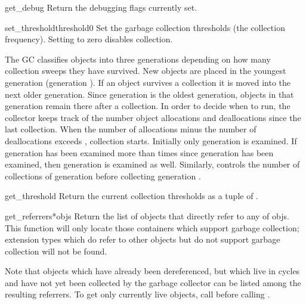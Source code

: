 \begin{funcdesc}{get_debug}{}
Return the debugging flags currently set.
\end{funcdesc}

\begin{funcdesc}{set_threshold}{threshold0}
Set the garbage collection thresholds (the collection frequency).
Setting  to zero disables collection.

The GC classifies objects into three generations depending on how many
collection sweeps they have survived.  New objects are placed in the
youngest generation (generation ).  If an object survives a
collection it is moved into the next older generation.  Since
generation  is the oldest generation, objects in that
generation remain there after a collection.  In order to decide when
to run, the collector keeps track of the number object allocations and
deallocations since the last collection.  When the number of
allocations minus the number of deallocations exceeds
, collection starts.  Initially only generation
 is examined.  If generation  has been examined more
than  times since generation  has been
examined, then generation  is examined as well.  Similarly,
 controls the number of collections of generation
 before collecting generation .
\end{funcdesc}

\begin{funcdesc}{get_threshold}{}
Return the current collection thresholds as a tuple of
.
\end{funcdesc}

\begin{funcdesc}{get_referrers}{*objs}
Return the list of objects that directly refer to any of objs. This
function will only locate those containers which support garbage
collection; extension types which do refer to other objects but do not
support garbage collection will not be found.

Note that objects which have already been dereferenced, but which live
in cycles and have not yet been collected by the garbage collector can
be listed among the resulting referrers.  To get only currently live
objects, call  before calling
.

\end{funcdesc}


